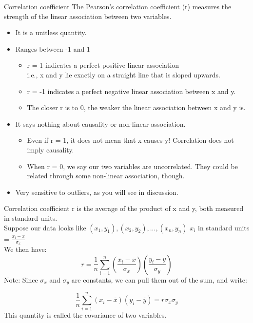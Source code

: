 \documentclass[aspectratio=169]{../latex_main/tntbeamer}  %
\begin{document}
	
	\begin{frame}{Correlation coefficient}
	    The Pearson’s correlation coefficient (r) measures the strength of the linear association between two variables. 
	    \begin{itemize}
	        \item It is a unitless quantity.
	        \item Ranges between -1 and 1
	        \begin{itemize}
	            \item r = 1 indicates a perfect positive \alert{linear} association\\
	            i.e., x and y lie exactly on a straight line that is sloped upwards. 
	            \item r = -1 indicates a perfect negative linear association between x and y.
	            \item The closer r is to 0, the weaker the linear association between x and y is.
	        \end{itemize}
	        \item It says nothing about causality or non-linear association.
	        \begin{itemize}
	            \item Even if r = 1, it does not mean that x causes y! \alert{Correlation does not imply causality}.
	            \item When r = 0, we say our two variables are uncorrelated. They could be related through some non-linear association, though.
	        \end{itemize}
	        \item Very sensitive to outliers, as you will see in discussion. 
	    \end{itemize}
	\end{frame}
	
	
	\begin{frame}{Correlation coefficient}
	    r is the average of the product of x and y, both measured in standard units. \\
Suppose our data looks like ${(x_1, y_1),(x_2,y_2),...,(x_n,y_n)} $  $x_i$ in standard units = $ \frac{x_i - \hat{x}}{\sigma_x}$\\
\bigskip
We then have:
\begin{equation*}
    r=\frac{1}{n}\sum\limits_{i=1}^n\left(\frac{x_i-\overline{x}}{\sigma_x}\right)\left(\frac{y_i-\overline{y}}{\sigma_y}\right)
\end{equation*}
Note: Since    $\sigma_x$    and    $\sigma_y$    are constants, we can pull them out of the sum, and write: 

\begin{equation*}
   \frac{1}{n}\sum\limits_{i=1}^n\left(x_i-\overline{x}\right)\left(y_i-\overline{y}\right) = r\sigma_x\sigma_y
\end{equation*}
	This quantity is called the covariance of two variables.
   
	\end{frame}
	
\end{document}
